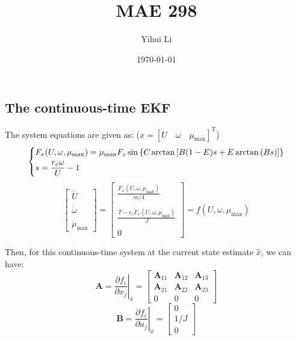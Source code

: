 \documentclass[letterpaper,12pt]{article}
\title{MAE 298}
\author{Yihui Li}
\date{\today}
\begin{document}
\setcounter{page}{1}
\subsection*{The continuous-time EKF}
The system equations are given as: ($x = [U \quad \omega \quad \mu_{\max}]^\mathrm{T}$)
\begin{equation*}
\begin{dcases}
F_x (U,\omega,\mu_{\max}) = \mu_{\max} F_z \sin\left\{C\arctan\left[B(1-E)s+E\arctan\left(Bs\right)\right]\right\} \\
s = \frac{r_e \omega}{U} - 1
\end{dcases}
\end{equation*}
\begin{equation*}
\left[
\begin{array}{c}
\dot{U} \\~\\
\dot{\omega} \\~\\
\dot{\mu}_{\max}
\end{array}
\right]
=
\left[
\begin{array}{c}
\displaystyle \frac{F_x (U,\omega,\mu_{\max}) }{m/4} \\~\\
\displaystyle \frac{T-r_e F_x (U,\omega,\mu_{\max}) }{J} \\~\\
0
\end{array}
\right]
=
f (U,\omega,\mu_{\max}) 
\end{equation*}
\par
Then, for this continuous-time system at the current state estimate $\hat{x}$, we can have:
\begin{equation*}
\mathbf{A} = \left.\frac{\partial f_i}{\partial x_j}\right|_{\hat{x}} =
\left[
\begin{array}{ccc}
\mathbf{A}_{11} & \mathbf{A}_{12} & \mathbf{A}_{13} \\
\mathbf{A}_{21} & \mathbf{A}_{22} & \mathbf{A}_{23} \\
0 & 0 & 0
\end{array}
\right]
\end{equation*}
\begin{equation*}
\mathbf{B} = \left.\frac{\partial f_i}{\partial u_j}\right|_{\hat{x}} =
\left[
\begin{array}{c}
0 \\
1/J \\
0
\end{array}
\right]
\end{equation*}
\end{document}
